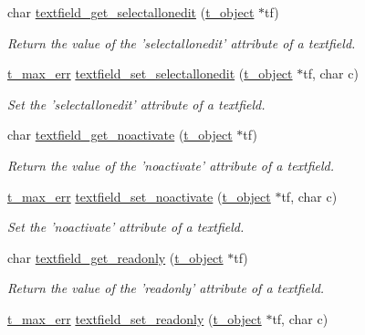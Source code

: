 \begin{DoxyCompactItemize}
char \hyperlink{group__textfield_gae3eebe8d0134d575ba3f8b8b3c814e92}{textfield\_\-get\_\-selectallonedit} (\hyperlink{structt__object}{t\_\-object} $\ast$tf)
\begin{DoxyCompactList}\small\item\em Return the value of the 'selectallonedit' attribute of a textfield. \item\end{DoxyCompactList}\item 
\hyperlink{group__datatypes_ga73edaae82b318855cc09fac994918165}{t\_\-max\_\-err} \hyperlink{group__textfield_ga334c020b1542124e3397f53cff31d8e1}{textfield\_\-set\_\-selectallonedit} (\hyperlink{structt__object}{t\_\-object} $\ast$tf, char c)
\begin{DoxyCompactList}\small\item\em Set the 'selectallonedit' attribute of a textfield. \item\end{DoxyCompactList}\item 
char \hyperlink{group__textfield_ga0d565f3cd53ee1b93ae596a5669b9ebd}{textfield\_\-get\_\-noactivate} (\hyperlink{structt__object}{t\_\-object} $\ast$tf)
\begin{DoxyCompactList}\small\item\em Return the value of the 'noactivate' attribute of a textfield. \item\end{DoxyCompactList}\item 
\hyperlink{group__datatypes_ga73edaae82b318855cc09fac994918165}{t\_\-max\_\-err} \hyperlink{group__textfield_ga099f145bf99b97e77af28b517d9b25d3}{textfield\_\-set\_\-noactivate} (\hyperlink{structt__object}{t\_\-object} $\ast$tf, char c)
\begin{DoxyCompactList}\small\item\em Set the 'noactivate' attribute of a textfield. \item\end{DoxyCompactList}\item 
char \hyperlink{group__textfield_ga7d305f5d1c0350202305a28b39aa7d94}{textfield\_\-get\_\-readonly} (\hyperlink{structt__object}{t\_\-object} $\ast$tf)
\begin{DoxyCompactList}\small\item\em Return the value of the 'readonly' attribute of a textfield. \item\end{DoxyCompactList}\item 
\hyperlink{group__datatypes_ga73edaae82b318855cc09fac994918165}{t\_\-max\_\-err} \hyperlink{group__textfield_ga465b39f09260c707dec50328c532e024}{textfield\_\-set\_\-readonly} (\hyperlink{structt__object}{t\_\-object} $\ast$tf, char c)

\end{DoxyCompactItemize}

